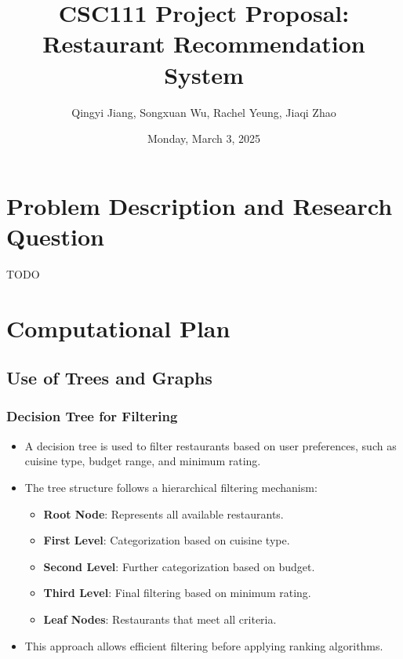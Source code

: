\documentclass[fontsize=11pt]{article}
\title{CSC111 Project Proposal: Restaurant Recommendation System}
\author{Qingyi Jiang, Songxuan Wu, Rachel Yeung, Jiaqi Zhao}
\date{Monday, March 3, 2025}
\begin{document}
\maketitle

\section*{Problem Description and Research Question}

TODO

\section*{Computational Plan}

\subsection*{Use of Trees and Graphs}

\subsubsection*{Decision Tree for Filtering}
\begin{itemize}
    \item A decision tree is used to filter restaurants based on user preferences, such as cuisine type, budget range, and minimum rating.
    \item The tree structure follows a hierarchical filtering mechanism: 
    \begin{itemize}
        \item \textbf{Root Node}: Represents all available restaurants.
        \item \textbf{First Level}: Categorization based on cuisine type.
        \item \textbf{Second Level}: Further categorization based on budget.
        \item \textbf{Third Level}: Final filtering based on minimum rating.
        \item \textbf{Leaf Nodes}: Restaurants that meet all criteria.
    \end{itemize}
    \item This approach allows efficient filtering before applying ranking algorithms.
\end{itemize}
\end{document}
